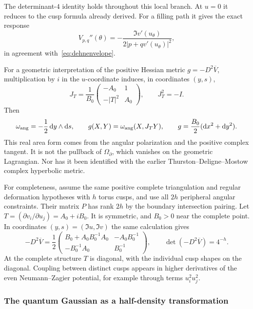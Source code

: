 The determinant-$4$ identity holds throughout this local branch.
At $u=0$ it reduces to the cusp formula already derived.
For a filling path it gives the exact response
\begin{equation}
 V_{p,q}''(\theta)
   =-\frac{\Im v'(u_\theta)}
            {2|p+qv'(u_\theta)|^2},
 \label{eq:NZexactcurvature}
\end{equation}
in agreement with~\eqref{eq:dehnenvelope}.

For a geometric interpretation of the positive Hessian metric
$g=-D^2\overline V$, multiplication by $i$ in the $u$-coordinate
induces, in coordinates $(y,s)$,
\[
 J_T=\frac1{B_0}
      \begin{pmatrix}-A_0&1\\-|T|^2&A_0\end{pmatrix},
 \qquad J_T^2=-I.
\]
Then
\begin{equation}
 \omega_{\rm ang}=-\frac12\mathop{}\!\mathrm d y\wedge\mathop{}\!\mathrm d s,\qquad
 g(X,Y)=\omega_{\rm ang}(X,J_TY),\qquad
 g=\frac{B_0}{2}(\mathop{}\!\mathrm d x^2+\mathop{}\!\mathrm d y^2).
 \label{eq:NZcompatiblemetric}
\end{equation}
This real area form comes from the angular polarization and the
positive complex tangent. It is not the pullback of
$\Omega_\partial$, which vanishes on the geometric Lagrangian.
Nor has it been identified with the earlier
Thurston--Deligne--Mostow complex hyperbolic metric.

For completeness, assume the same positive complete triangulation and
regular deformation hypotheses with $h$ torus cusps, and use all $2h$
peripheral angular constraints. Their matrix $P$ has rank $2h$ by the
boundary intersection pairing. Let
$T=(\partial v_i/\partial u_j)=A_0+iB_0$.
It is symmetric, and $B_0>0$ near the complete point. In coordinates
$(y,s)=(\Im u,\Im v)$ the same calculation gives
\begin{equation}
 -D^2\overline V
  =\frac12\begin{pmatrix}
   B_0+A_0B_0^{-1}A_0&-A_0B_0^{-1}\\
   -B_0^{-1}A_0&B_0^{-1}
   \end{pmatrix},\qquad
 \det(-D^2\overline V)=4^{-h}.
 \label{eq:NZmulticuspHessian}
\end{equation}
At the complete structure $T$ is diagonal, with the individual cusp
shapes on the diagonal. Coupling between distinct cusps appears in
higher derivatives of the even Neumann--Zagier potential, for example
through terms $u_i^2u_j^2$.

\subsubsection{The quantum Gaussian as a half-density transformation}


